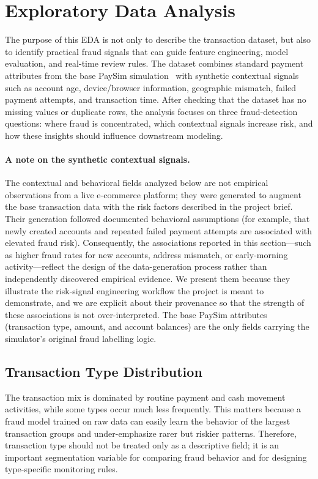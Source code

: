 \section{Exploratory Data Analysis}
\label{sec:eda}

The purpose of this EDA is not only to describe the transaction dataset, but also to identify practical fraud signals that can guide feature engineering, model evaluation, and real-time review rules. The dataset combines standard payment attributes from the base PaySim simulation~\citep{lopez2016paysim} with synthetic contextual signals such as account age, device/browser information, geographic mismatch, failed payment attempts, and transaction time. After checking that the dataset has no missing values or duplicate rows, the analysis focuses on three fraud-detection questions: where fraud is concentrated, which contextual signals increase risk, and how these insights should influence downstream modeling.

\paragraph{A note on the synthetic contextual signals.} The contextual and behavioral fields analyzed below are not empirical observations from a live e-commerce platform; they were generated to augment the base transaction data with the risk factors described in the project brief. Their generation followed documented behavioral assumptions (for example, that newly created accounts and repeated failed payment attempts are associated with elevated fraud risk). Consequently, the associations reported in this section---such as higher fraud rates for new accounts, address mismatch, or early-morning activity---reflect the design of the data-generation process rather than independently discovered empirical evidence. We present them because they illustrate the risk-signal engineering workflow the project is meant to demonstrate, and we are explicit about their provenance so that the strength of these associations is not over-interpreted. The base PaySim attributes (transaction type, amount, and account balances) are the only fields carrying the simulator's original fraud labelling logic.

\subsection{Transaction Type Distribution}

The transaction mix is dominated by routine payment and cash movement activities, while some types occur much less frequently. This matters because a fraud model trained on raw data can easily learn the behavior of the largest transaction groups and under-emphasize rarer but riskier patterns. Therefore, transaction type should not be treated only as a descriptive field; it is an important segmentation variable for comparing fraud behavior and for designing type-specific monitoring rules.

